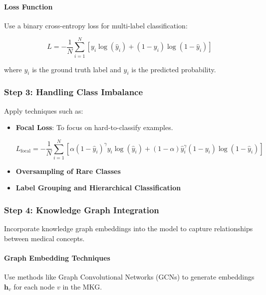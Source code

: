 \documentclass[12pt, a4paper]{article}
\begin{document}
\paragraph{Loss Function}

Use a binary cross-entropy loss for multi-label classification:

\begin{equation}
L = -\frac{1}{N} \sum_{i=1}^{N} \left[ y_i \log(\hat{y}_i) + (1 - y_i) \log(1 - \hat{y}_i) \right]
\end{equation}

where \( y_i \) is the ground truth label and \( \hat{y}_i \) is the predicted probability.

\subsubsection{Step 3: Handling Class Imbalance}

Apply techniques such as:

\begin{itemize}
    \item \textbf{Focal Loss}: To focus on hard-to-classify examples.

    \begin{equation}
    L_{\text{focal}} = -\frac{1}{N} \sum_{i=1}^{N} \left[ \alpha (1 - \hat{y}_i)^\gamma y_i \log(\hat{y}_i) + (1 - \alpha) \hat{y}_i^\gamma (1 - y_i) \log(1 - \hat{y}_i) \right]
    \end{equation}

    \item \textbf{Oversampling of Rare Classes}
    \item \textbf{Label Grouping and Hierarchical Classification}
\end{itemize}

\subsubsection{Step 4: Knowledge Graph Integration}

Incorporate knowledge graph embeddings into the model to capture relationships between medical concepts.

\paragraph{Graph Embedding Techniques}

Use methods like Graph Convolutional Networks (GCNs) to generate embeddings \( \mathbf{h}_v \) for each node \( v \) in the MKG.
\end{document}
